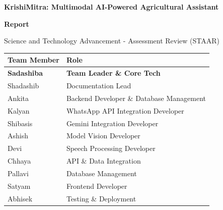 \documentclass[12pt, a4paper]{report}
\begin{document}
\begin{titlepage}
    \centering
    \vspace*{1cm}
    
    {\Huge \textbf{KrishiMitra: Multimodal AI-Powered Agricultural Assistant}\par}
    
    \vspace{1.5cm}
    
    {\Large \textbf{Report}\par}
    \vspace{0.5cm}
    {\large Science and Technology Advancement - Assessment Review (STAAR)\par}
    
    \vspace{2cm}
    
    \begin{table}[H]
        \centering
        \renewcommand{\arraystretch}{1.3}
        \begin{tabular}{|l|l|}
            \hline
            \textbf{Team Member} & \textbf{Role} \\
            \hline
            \textbf{Sadashiba} & \textbf{Team Leader \& Core Tech} \\
            Shadashib & Documentation Lead \\
            Ankita & Backend Developer \& Database Management \\
            Kalyan & WhatsApp API Integration Developer \\
            Shibasis & Gemini Integration Developer \\
            Ashish & Model Vision Developer \\
            Devi & Speech Processing Developer \\
            Chhaya & API \& Data Integration \\
            Pallavi & Database Management \\
            Satyam & Frontend Developer \\
            Abhisek & Testing \& Deployment \\
            \hline
        \end{tabular}
    \end{table}

    \vfill
    
    

\end{titlepage}
\end{document}
